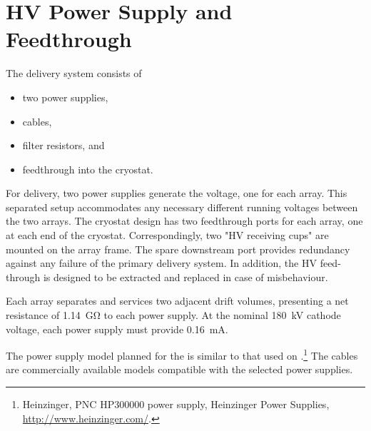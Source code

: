 
\section {HV Power Supply and Feedthrough}

The  delivery system consists of
\begin{itemize}
\item two power supplies,
\item {} cables,
\item filter resistors, and
\item {} feedthrough into the cryostat.
\end{itemize}

For  delivery, two power supplies generate the voltage, one for each  array. 
This separated setup accommodates any necessary different running voltages between the two  arrays.
The cryostat design has two feedthrough ports for each  array, one at each end of the cryostat. Correspondingly, two "HV receiving cups" are mounted on the  array frame. The spare downstream port provides redundancy against any failure of the primary  delivery system. In addition, the HV feed-through is designed to be extracted and replaced in case of misbehaviour.

Each  array separates and services two adjacent drift volumes, 
presenting a net resistance of \SI{1.14}{\giga\ohm} to each power supply. At the nominal \SI{180}{kV} cathode voltage, each power supply must provide \SI{0.16}{mA}.

The power supply model planned for the  is similar to that used on .\footnote{Heinzinger, PNC HP300000  power supply, Heinzinger\texttrademark{} Power Supplies, \url{http://www.heinzinger.com/}.}  %
The  cables are commercially available models compatible with the selected power supplies. 


